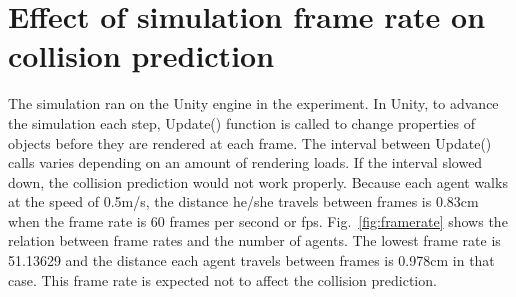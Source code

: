 \section{Effect of simulation frame rate on collision prediction}
The simulation ran on the Unity engine in the experiment. In Unity, to advance the simulation each step, Update() function is called to change properties of objects before they are rendered at each frame. The interval between Update() calls varies depending on an amount of rendering loads. If the interval slowed down, the collision prediction would not work properly. Because each agent walks at the speed of 0.5m/s, the distance he/she travels between frames is 0.83cm when the frame rate is 60 frames per second or fps. Fig.~\ref{fig:framerate} shows the relation between frame rates and the number of agents. The lowest frame rate is 51.13629 and the distance each agent travels between frames is 0.978cm in that case. This frame rate is expected not to affect the collision prediction.

